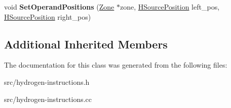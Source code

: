 \begin{DoxyCompactItemize}
\item 
\hypertarget{classv8_1_1internal_1_1_h_compare_numeric_and_branch_a9c91f1bb25cdc544062089cdc152d34b}{}void {\bfseries Set\+Operand\+Positions} (\hyperlink{classv8_1_1internal_1_1_zone}{Zone} $\ast$zone, \hyperlink{classv8_1_1internal_1_1_h_source_position}{H\+Source\+Position} left\+\_\+pos, \hyperlink{classv8_1_1internal_1_1_h_source_position}{H\+Source\+Position} right\+\_\+pos)\label{classv8_1_1internal_1_1_h_compare_numeric_and_branch_a9c91f1bb25cdc544062089cdc152d34b}

\end{DoxyCompactItemize}
\subsection*{Additional Inherited Members}


The documentation for this class was generated from the following files\+:\begin{DoxyCompactItemize}
\item 
src/hydrogen-\/instructions.\+h\item 
src/hydrogen-\/instructions.\+cc\end{DoxyCompactItemize}
